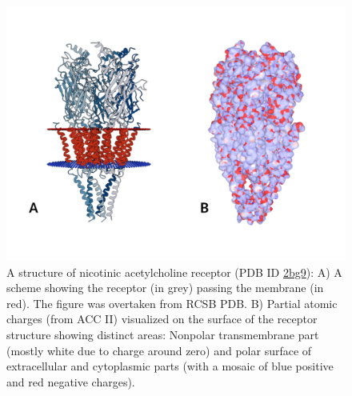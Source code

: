 \documentclass[oneside]{memoir}
\begin{document}
\begin{figure}
\includegraphics[width=.9\linewidth]{figure4.png}
\renewcommand{\thefigure}{4}
\caption{A structure of nicotinic acetylcholine receptor (PDB ID \href{https://www.ebi.ac.uk/pdbe/entry/pdb/2bg9}{2bg9}): A) A scheme showing the receptor (in grey) passing the membrane (in red). The figure was overtaken from RCSB PDB. B) Partial atomic charges (from ACC II) visualized on the surface of the receptor structure showing distinct areas: Nonpolar transmembrane part (mostly white due to charge around zero) and polar surface of extracellular and cytoplasmic parts (with a mosaic of blue positive and red negative charges).}
\end{figure}
\end{document}
